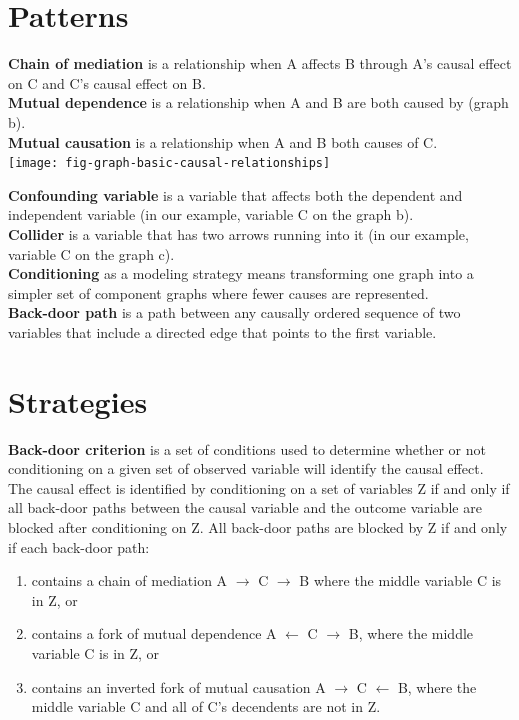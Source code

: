\section*{Patterns}

\textbf{Chain of mediation} is a relationship when A affects B through A's causal effect on C and C's causal effect on B.\\
\textbf{Mutual dependence} is a relationship when A and B are both caused by  (graph b).\\
\textbf{Mutual causation} is a relationship when A and B both causes of C. \\

\texttt{[image: fig-graph-basic-causal-relationships]}

\textbf{Confounding variable} is a variable that affects both the dependent and independent variable (in our example, variable C on the graph b).\\
\textbf{Collider} is a variable that has two arrows running into it (in our example, variable C on the graph c).\\
\textbf{Conditioning} as a modeling strategy means transforming one graph into a simpler set of component graphs where fewer causes are represented.\\
\textbf{Back-door path} is a path between any causally ordered sequence  of two variables that include a directed edge that points to the first variable. \\

\section*{Strategies}


\textbf{Back-door criterion} is a set of conditions used to determine whether or not conditioning on a given set of observed variable will identify the causal effect. The causal effect is identified by conditioning on a set of variables Z if and only if all back-door paths between the causal variable and the outcome variable are blocked after conditioning on Z. All back-door paths are blocked by Z if and only if each back-door path:
\begin{enumerate}
\item contains a chain of mediation A $\rightarrow$ C $\rightarrow$  B where the middle variable C is in Z, or
\item contains a fork of mutual dependence A $\leftarrow$ C $\rightarrow$ B, where the middle variable C is in Z, or
\item contains an inverted fork of mutual causation A $\rightarrow$ C $\leftarrow$  B, where the middle variable C and all of C's decendents are not in Z.
\end{enumerate}

\nocite{Morgan.2014}
\nocite{Pearl.2009}





